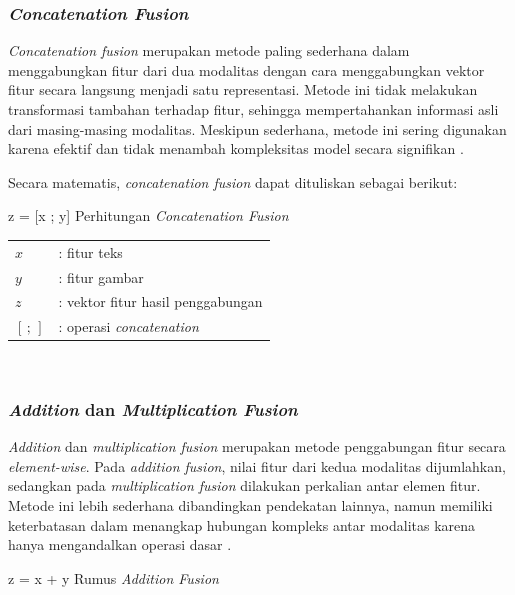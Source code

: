 \subsubsection{\textit{Concatenation Fusion}}
\textit{Concatenation fusion} merupakan metode paling sederhana dalam menggabungkan fitur dari dua modalitas dengan cara menggabungkan vektor fitur secara langsung menjadi satu representasi. Metode ini tidak melakukan transformasi tambahan terhadap fitur, sehingga mempertahankan informasi asli dari masing-masing modalitas. Meskipun sederhana, metode ini sering digunakan karena efektif dan tidak menambah kompleksitas model secara signifikan \cite{ngiam2011multimodal}.

Secara matematis, \textit{concatenation fusion} dapat dituliskan sebagai berikut:

\begin{equationcaptioned}{
	z = [x ; y]
}{
	Perhitungan \textit{Concatenation Fusion}
}
\end{equationcaptioned}

\noindent
{}

\begin{tabular}{l l}
$x$      & : fitur teks \\
$y$      & : fitur gambar \\
$z$      & : vektor fitur hasil penggabungan \\
$[\,;\,]$ & : operasi \textit{concatenation} \\
\end{tabular} \\

\subsubsection{\textit{Addition} dan \textit{Multiplication Fusion}} 
\textit{Addition} dan \textit{multiplication fusion} merupakan metode penggabungan fitur secara \textit{element-wise}. Pada \textit{addition fusion}, nilai fitur dari kedua modalitas dijumlahkan, sedangkan pada \textit{multiplication fusion} dilakukan perkalian antar elemen fitur. Metode ini lebih sederhana dibandingkan pendekatan lainnya, namun memiliki keterbatasan dalam menangkap hubungan kompleks antar modalitas karena hanya mengandalkan operasi dasar \cite{kiela2019supervised}.

\begin{equationcaptioned}{
	z = x + y
}{
	Rumus \textit{Addition Fusion}
}
\end{equationcaptioned}

